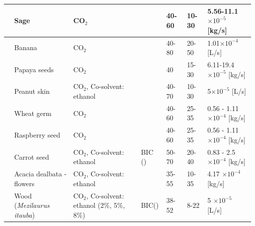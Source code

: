 \documentclass[a4paper,fleqn]{cas-dc}
\begin{document}
\begin{table}[h!]
{\begin{tabular}{|p{2.5cm}|p{2cm}|p{1.75cm}|p{4.5cm}|p{1.5cm}|p{1.5cm}|p{3cm}|}
		\citet{Pavlic2017} & Sage & CO$_2$ & \citet{Reverchon1996} \newline  \citet{Brunner1994} \newline \citet{Kandiah1990} &  40-60 & 10-30 & 5.56-11.1$\times 10^{-5}$ [kg/s]\\ \hline
		\citet{Sartori2017} & Banana & CO$_2$ & \citet{Sovova1994} \newline  \citet{Reverchon1994} \newline \citet{Esquivel1999} &  40-80 & 20-50 & 1.01$\times 10^{-4}$ [L/s]\\ \hline
		\citet{Hall2018} & Papaya seeds & CO$_2$ & \citet{Sovova1994} \newline  \citet{Goto1993} \newline \citet{Esquivel1999} &  40 & 15-30 & 6.11-19.4$\times 10^{-5}$ [kg/s]\\ \hline
		\citet{Putra2018} & Peanut skin & CO$_2$, \newline Co-solvent: ethanol & \citet{Brunner1994} \newline \citet{Esquivel1999} &  40-70  & 10-30 & 5$\times 10^{-5}$ [L/s]\\ \hline
		\citet{Putra2018} & Wheat germ & CO$_2$ & \citet{Brunner1994} \newline \citet{Esquivel1999} \newline \citet{Kandiah1990} \newline \citet{Reverchon1994} &  40-60  & 25-35 & 0.56 - 1.11 $\times 10^{-4}$ [kg/s]\\ \hline
		\citet{Pavlic2020} & Raspberry seed & CO$_2$ & \citet{Brunner1994} \newline \citet{Esquivel1999} \newline \citet{Kandiah1990} \newline \citet{Reverchon1994} &  40-60  & 25-35 & 0.56 - 1.11 $\times 10^{-4}$ [kg/s]\\ \hline
		\citet{Priyanka2020} & Carrot seed & CO$_2$, \newline Co-solvent: ethanol & BIC (\citet{Sovova1994}) \newline \citet{Reverchon1997} &  50-70  & 20-40 & 0.83 - 2.5 $\times 10^{-4}$ [kg/s]\\ \hline
		\citet{Casas2021} & Acacia dealbata - ﬂowers & CO$_2$, \newline Co-solvent: ethanol & \citet{Esquivel1999} \newline \citet{Sovova1994} &  35-55  & 10-35 & 4.17 $\times 10^{-4}$ [kg/s]\\ \hline
		\citet{Acosta2014} & Wood (\textit{Mezilaurus itauba}) & CO$_2$, \newline Co-solvent: ethanol (2\%, 5\%, 8\%) & BIC(\citet{Sovova1994}) &  38-52  & 8-22 & 5 $\times 10^{-5}$ [L/s]\\ \hline

\end{tabular}}
\end{table}
\end{document}
